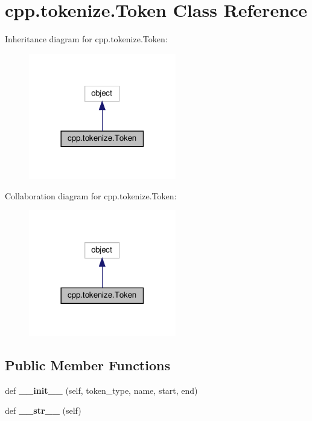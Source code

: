 \hypertarget{classcpp_1_1tokenize_1_1_token}{}\section{cpp.\+tokenize.\+Token Class Reference}
\label{classcpp_1_1tokenize_1_1_token}


Inheritance diagram for cpp.\+tokenize.\+Token\+:
\nopagebreak
\begin{figure}[H]
\begin{center}
\leavevmode
\includegraphics[width=182pt]{classcpp_1_1tokenize_1_1_token__inherit__graph}
\end{center}
\end{figure}


Collaboration diagram for cpp.\+tokenize.\+Token\+:
\nopagebreak
\begin{figure}[H]
\begin{center}
\leavevmode
\includegraphics[width=182pt]{classcpp_1_1tokenize_1_1_token__coll__graph}
\end{center}
\end{figure}
\subsection*{Public Member Functions}
\begin{DoxyCompactItemize}
\item 
\mbox{\label{classcpp_1_1tokenize_1_1_token_a7da7659a5a6c61d0f4b8590cf96e19fd}} 
def {\bfseries \+\_\+\+\_\+init\+\_\+\+\_\+} (self, token\+\_\+type, name, start, end)
\item 
\mbox{\label{classcpp_1_1tokenize_1_1_token_a98e024051039637a18601fcbb0232cc2}} 
def {\bfseries \+\_\+\+\_\+str\+\_\+\+\_\+} (self)
\end{DoxyCompactItemize}
